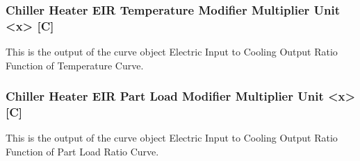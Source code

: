 \subsubsection{Chiller Heater EIR Temperature Modifier Multiplier Unit \textless{}x\textgreater{} {[}C{]}}\label{chiller-heater-eir-temperature-modifier-multiplier-unit-x-c}

This is the output of the curve object Electric Input to Cooling Output Ratio Function of Temperature Curve.

\subsubsection{Chiller Heater EIR Part Load Modifier Multiplier Unit \textless{}x\textgreater{} {[}C{]}}\label{chiller-heater-eir-part-load-modifier-multiplier-unit-x-c}

This is the output of the curve object Electric Input to Cooling Output Ratio Function of Part Load Ratio Curve.


